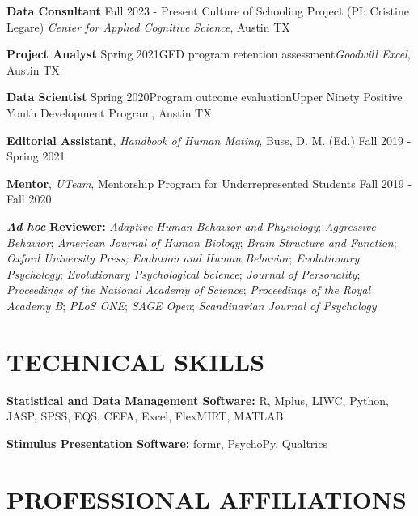 \documentclass[10pt,]{article}
\begin{document}
\textbf{Data Consultant}
\hfill \textcolor{light-gray}{Fall 2023 - Present} \newline Culture of
Schooling Project (PI: Cristine Legare) \newline \emph{Center for
Applied Cognitive Science}, Austin TX

\textbf{Project Analyst}
\hfill \textcolor{light-gray}{Spring 2021}\newline GED program retention
assessment\newline \emph{Goodwill Excel}, Austin TX

\textbf{Data Scientist}
\hfill \textcolor{light-gray}{Spring 2020}\newline Program outcome
evaluation\newline Upper Ninety Positive Youth Development Program,
Austin TX

\textbf{Editorial Assistant}, \emph{Handbook of Human Mating}, Buss, D.
M. (Ed.) \hfill \textcolor{light-gray}{Fall 2019 - Spring 2021}

\textbf{Mentor}, \emph{UTeam}, Mentorship Program for Underrepresented
Students \hfill \textcolor{light-gray}{Fall 2019 - Fall 2020}

\textbf{\emph{Ad hoc}} \textbf{Reviewer:} \newline \emph{Adaptive Human
Behavior and Physiology}; \emph{Aggressive Behavior}; \emph{American
Journal of Human Biology}; \emph{Brain Structure and Function};
\emph{Oxford University Press;} \emph{Evolution and Human Behavior};
\emph{Evolutionary Psychology}; \emph{Evolutionary Psychological
Science}; \emph{Journal of Personality}; \emph{Proceedings of the
National Academy of Science}; \emph{Proceedings of the Royal Academy B};
\emph{PLoS ONE}; \emph{SAGE Open}; \emph{Scandinavian Journal of
Psychology}

\section{TECHNICAL SKILLS}\label{technical-skills}

\textbf{Statistical and Data Management Software:} R, Mplus, LIWC,
Python, JASP, SPSS, EQS, CEFA, Excel, FlexMIRT, MATLAB

\textbf{Stimulus Presentation Software:} formr, PsychoPy, Qualtrics

\section{PROFESSIONAL AFFILIATIONS}\label{professional-affiliations}
\end{document}
